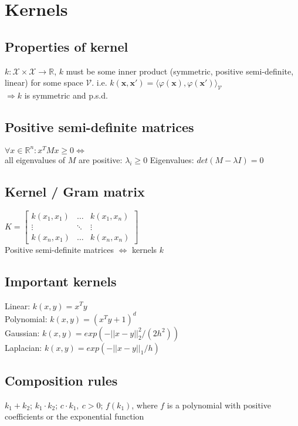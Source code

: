 \section*{Kernels}

\subsection*{Properties of kernel}
$k: \mathcal{X} \times \mathcal{X} \rightarrow \mathbb{R}$, $k$ must be some inner product (symmetric, positive semi-definite, linear) for some space $\mathcal{V}$.
i.e. $k(\mathbf{x}, \mathbf{x'}) = \langle \varphi(\mathbf{x}), \varphi(\mathbf{x'}) \rangle_\mathcal{V}$\\
$\Rightarrow k$ is symmetric and p.s.d. 

\subsection*{Positive semi-definite matrices}
$\forall x \in \mathbb{R}^n: x^TMx \geq 0 \Leftrightarrow$\\
all eigenvalues of $M$ are positive: $\lambda_i\geq 0$
Eigenvalues: $det(M - \lambda I) = 0$

\subsection*{Kernel / Gram matrix}
$K = 
\begin{bmatrix}
	k(x_1,x_1) & \dots & k(x_1,x_n) \\
	\vdots & \ddots & \vdots \\
	k(x_n, x_1) & \dots & k(x_n,x_n)
\end{bmatrix}$\\
Positive semi-definite matrices $\Leftrightarrow$ kernels $k$

\subsection*{Important kernels}
Linear: $k(x,y)=x^T y$\\
Polynomial: $k(x,y)=(x^T y + 1)^d$\\
Gaussian: $k(x,y) = exp(-||x-y||_2^2/(2h^2))$\\
Laplacian: $k(x,y) = exp(-||x-y||_1/h)$

\subsection*{Composition rules}
$k_1 + k_2$; $k_1 \cdot k_2$; $c \cdot k_1,\ c > 0$; $f(k_1)$, where $f$ is a polynomial with positive coefficients or the exponential function

